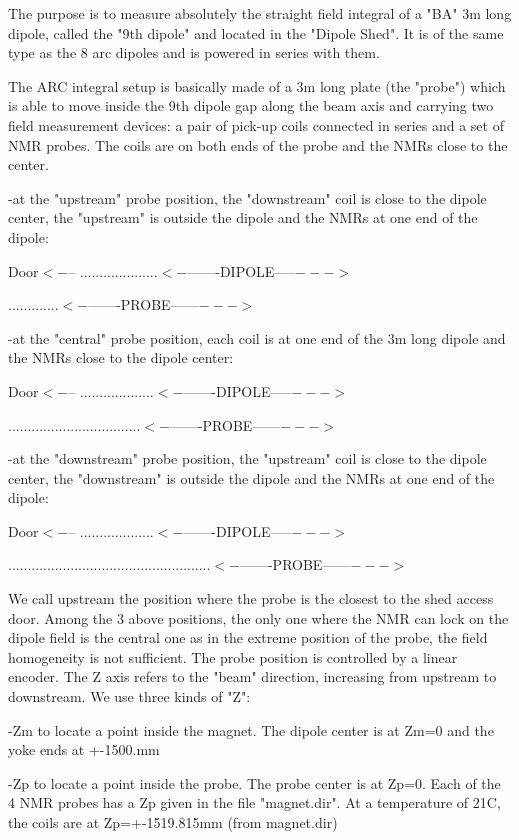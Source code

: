 {The purpose is to measure absolutely the straight field integral of a 
"BA"
3m long dipole, called the "9th dipole" and located in the
"Dipole Shed". It is of the same type as the 8 arc dipoles
and is powered in series with them. 

The ARC integral setup is basically made of a 3m long plate (the 
"probe")
which is able to move inside the 9th dipole gap along the beam axis and carrying 
two
field measurement devices: a pair of pick-up coils connected in series and a
set of NMR probes. The coils are on both ends of the probe and the NMRs close
to the center. 

-at the "upstream" probe position, the 
"downstream"
coil is close to the dipole center, the "upstream" is outside
the dipole and the NMRs at one end of the dipole: 

Door$<-$-- ....................$<-$-------DIPOLE-----$--->$ 

.............$<-$-------PROBE------$--->$ 

-at the "central" probe position, each coil is at one end
of the 3m long dipole and the NMRs close to the dipole center: 

Door$<-$-- ...................$<-$-------DIPOLE-----$--->$ 

..................................$<-$-------PROBE------$--->$ 

-at the "downstream" probe position, the 
"upstream"
coil is close to the dipole center, the "downstream" is outside
the dipole and the NMRs at one end of the dipole: 

Door$<-$-- ...................$<-$-------DIPOLE-----$--->$ 

....................................................$<-$-------PROBE------$--->$ 

We call upstream the position where the probe is the closest to the shed access
door. Among the 3 above positions, the only one where the NMR can lock on the 
dipole
field is the central one as in the extreme position of the probe, the field 
homogeneity
is not sufficient. The probe position is controlled by a linear encoder. The
Z axis refers to the "beam" direction, increasing from upstream
to downstream. We use three kinds of "Z": 

-Zm to locate a point inside the magnet. The dipole center is at Zm=0 and the
yoke ends at +-1500.mm 

-Zp to locate a point inside the probe. The probe center is at Zp=0. Each of
the 4 NMR probes has a Zp given in the file "magnet.dir".
At a temperature of 21C, the coils are at Zp=+-1519.815mm (from magnet.dir) 

}

